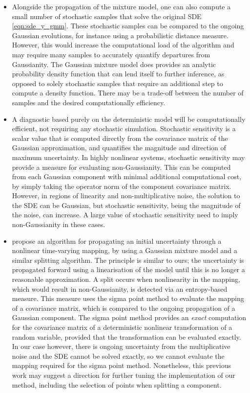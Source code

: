 \begin{itemize}
	\item Alongside the propagation of the mixture model, one can also compute a small number of stochastic samples that solve the original SDE \cref{eqn:sde_y_gmm}.
		These stochastic samples can be compared to the ongoing Gaussian evolutions, for instance using a probabilistic distance measure.
		However, this would increase the computational load of the algorithm and may require many samples to accurately quantify departures from Gaussianity.
	 The Gaussian mixture model does provides an analytic probability density function that can lend itself to further inference, as opposed to solely stochastic samples that require an additional step to compute a density function.
	 There may be a trade-off between the number of samples and the desired computationally efficiency.

	\item A diagnostic based purely on the deterministic model will be computationally efficient, not requiring any stochastic simulation.
		Stochastic sensitivity is a scalar value that is computed directly from the covariance matrix of the Gaussian approximation, and quantifies the magnitude and direction of maximum uncertainty.
		In highly nonlinear systems, stochastic sensitivity may provide a measure for evaluating non-Gaussianity.
		This can be computed from each Gaussian component with minimal additional computational cost, by simply taking the operator norm of the component covariance matrix.
		However, in regions of linearity and non-multiplicative noise, the solution to the SDE can be Gaussian, but stochastic sensitivity, being the magnitude of the noise, can increase.
		A large value of stochastic sensitivity need to imply non-Gaussianity in these cases.


	\item \citet{DeMarsEtAl_2013_EntropyBasedApproachUncertainty} propose an algorithm for propagating an initial uncertainty through a nonlinear time-varying mapping, by using a Gaussian mixture model and a similar splitting algorithm.
The principle is similar to ours; the uncertainty is propagated forward using a linearisation of the model until this is no longer a reasonable approximation.
A split occurs when nonlinearity in the mapping, which would result in non-Gaussianity, is detected via an entropy-based measure.
This measure uses the sigma point method to evaluate the mapping of a covariance matrix, which is compared to the ongoing propagation of a Gaussian component.
The sigma point method provides an \emph{exact} computation for the covariance matrix of a deterministic nonlinear transformation of a random variable, provided that the transformation can be evaluated exactly.
In our case however, there is ongoing uncertainty from the multiplicative noise and the SDE cannot be solved exactly, so we cannot evaluate the mapping required for the sigma point method.
Nonetheless, this previous work may suggest a direction for further tuning the implementation of our method, including the selection of points when splitting a component.

\end{itemize}
